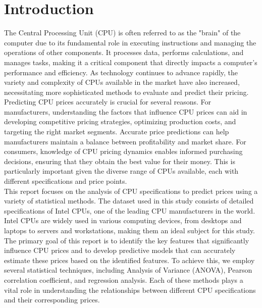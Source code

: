 \section{Introduction}

The Central Processing Unit (CPU) is often referred to as the "brain" of the computer due to its fundamental role in executing instructions and managing the operations of other components. It processes data, performs calculations, and manages tasks, making it a critical component that directly impacts a computer's performance and efficiency. As technology continues to advance rapidly, the variety and complexity of CPUs available in the market have also increased, necessitating more sophisticated methods to evaluate and predict their pricing.\\

Predicting CPU prices accurately is crucial for several reasons. For manufacturers, understanding the factors that influence CPU prices can aid in developing competitive pricing strategies, optimizing production costs, and targeting the right market segments. Accurate price predictions can help manufacturers maintain a balance between profitability and market share. For consumers, knowledge of CPU pricing dynamics enables informed purchasing decisions, ensuring that they obtain the best value for their money. This is particularly important given the diverse range of CPUs available, each with different specifications and price points.\\

This report focuses on the analysis of CPU specifications to predict prices using a variety of statistical methods. The dataset used in this study consists of detailed specifications of Intel CPUs, one of the leading CPU manufacturers in the world. Intel CPUs are widely used in various computing devices, from desktops and laptops to servers and workstations, making them an ideal subject for this study.\\

The primary goal of this report is to identify the key features that significantly influence CPU prices and to develop predictive models that can accurately estimate these prices based on the identified features. To achieve this, we employ several statistical techniques, including Analysis of Variance (ANOVA), Pearson correlation coefficient, and regression analysis. Each of these methods plays a vital role in understanding the relationships between different CPU specifications and their corresponding prices.\\


